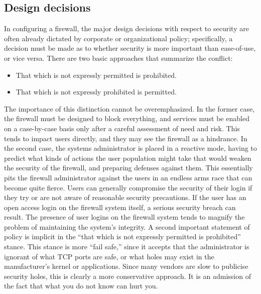 \subsection{Design decisions}
In configuring a firewall, the major design decisions with respect to
security are often already dictated by corporate or organizational
policy; specifically, a decision must be made as to whether security is
more important than ease-of-use, or vice versa. There are two basic
approaches that summarize the conflict:
\begin{itemize}
   \item That which is not expressly permitted is prohibited.
   \item That which is not expressly prohibited is permitted.
\end{itemize}

The importance of this distinction cannot be overemphasized. In the
former case, the firewall must be designed to block everything, and
services must be enabled on a case-by-case basis only after a careful
assessment of need and risk. This tends to impact users directly, and
they may see the firewall as a hindrance. In the second case, the
systems administrator is placed in a reactive mode, having to predict
what kinds of actions the user population might take that would weaken
the security of the firewall, and preparing defenses against them. This
essentially pits the firewall administrator against the users in an
endless arms race that can become quite fierce. Users can generally
compromise the security of their login if they try or are not aware of
reasonable security precautions. If the user has an open access login
on the firewall system itself, a serious security breach can result.
The presence of user logins on the firewall system tends to magnify the
problem of maintaining the system's integrity. A second important
statement of policy is implicit in the ``that which is not expressly
permitted is prohibited'' stance. This stance is more ``fail safe,''
since it accepts that the administrator is ignorant of what TCP ports
are safe, or what holes may exist in the manufacturer's kernel or
applications. Since many vendors are slow to publicise security holes,
this is clearly a more conservative approach. It is an admission of the
fact that what you do not know can hurt you.


